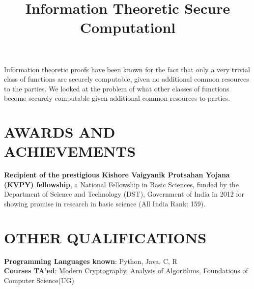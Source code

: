 \documentclass[margin]{res}
\begin{document}
\begin{resume}
\title{\textbf{Information Theoretic Secure Computation}}
\begin{position}
 Information theoretic proofs have been known for the fact that only a very trivial class of functions are securely computable, given no additional common resources to the parties. We looked at the problem of what other classes of functions become securely computable given additional common resources to parties.
\end{position}

\fi


\section{AWARDS AND ACHIEVEMENTS}

\textbf{Recipient of the prestigious Kishore Vaigyanik Protsahan Yojana (KVPY) fellowship}, a National Fellowship
in Basic Sciences, funded by the Department of Science and Technology (DST), Government of
India in 2012 for showing promise in research in basic science (All India Rank: 159).
\par

\section{OTHER QUALIFICATIONS}

\textbf{Programming Languages known}: Python, Java, C, R \\
\textbf{Courses TA'ed}: Modern Cryptography, Analysis of Algorithms, Foundations of Computer Science(UG)

\begin{format}
\title{l}\\
\\
\body\\
\end{format}




\end{resume}
\end{document}

